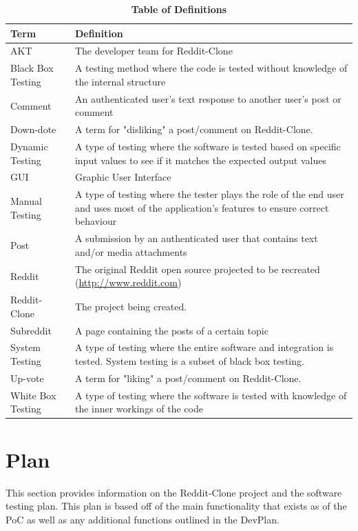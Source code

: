 \documentclass[12pt,fleqn]{article}
\begin{document}
\begin{table}[ht]
\caption{\textbf{Table of Definitions}} \label{Definitions}
\begin{tabularx}{\textwidth}{p{4cm}X}
\toprule
\textbf{Term} & \textbf{Definition}\\
\midrule
AKT & The developer team for Reddit-Clone\\
Black Box Testing & A testing method where the code is tested without knowledge of the internal structure \\
Comment & An authenticated user's text response to another user's post or comment \\
Down-dote & A term for "disliking" a post/comment on Reddit-Clone. \\
Dynamic Testing & A type of testing where the software is tested based on specific input values to see if it matches the expected output values \\
GUI & Graphic User Interface \\ 
Manual Testing & A type of testing where the tester plays the role of the end user and uses most of the application's features to ensure correct behaviour \\
Post & A submission by an authenticated user that contains text and/or media attachments \\
Reddit & The original Reddit open source projected to be recreated (\url{http://www.reddit.com})\\
Reddit-Clone & The project being created.\\
Subreddit & A page containing the posts of a certain topic \\
System Testing & A type of testing where the entire software and integration is tested. System testing is a subset of black box testing.\\
Up-vote & A term for "liking" a post/comment on Reddit-Clone.  \\
White Box Testing & A type of testing where the software is tested with knowledge of the inner workings of the code \\
\bottomrule
\end{tabularx}
\end{table}	

\pagebreak
\section {Plan}
This section provides information on the Reddit-Clone project and the software testing plan. This plan is based off of the main functionality that exists as of the PoC as well as any additional functions outlined in the DevPlan.
\end{document}
